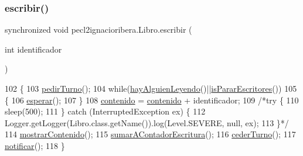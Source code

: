 \subsubsection{\texorpdfstring{escribir()}{escribir()}}
{\footnotesize\ttfamily synchronized void pecl2ignacioribera.\+Libro.\+escribir (\begin{DoxyParamCaption}\item[{int}]{identificador }\end{DoxyParamCaption})\hspace{0.3cm}{\ttfamily [inline]}}


\begin{DoxyCode}
102     \{
103         \mbox{\hyperlink{classpecl2ignacioribera_1_1_libro_aa68bbbcfa16984a13f848e8a2038c97a}{pedirTurno}}();
104         \textcolor{keywordflow}{while}(\mbox{\hyperlink{classpecl2ignacioribera_1_1_libro_a3ec78c4737fd60d84388e87f7f1d606f}{hayAlguienLeyendo}}()||\mbox{\hyperlink{classpecl2ignacioribera_1_1_libro_aabc572905978f8f3e19dd6533084149a}{isPararEscritores}}())
105         \{
106             \mbox{\hyperlink{classpecl2ignacioribera_1_1_libro_a4c83b4f2726cfe98dcac1feb72e39b02}{esperar}}();
107         \}
108         \mbox{\hyperlink{classpecl2ignacioribera_1_1_libro_acb52ac741427b64544c1f65b6bbb898a}{contenido}} = \mbox{\hyperlink{classpecl2ignacioribera_1_1_libro_acb52ac741427b64544c1f65b6bbb898a}{contenido}} + identificador;
109         \textcolor{comment}{/*try \{}
110 \textcolor{comment}{            sleep(500);}
111 \textcolor{comment}{        \} catch (InterruptedException ex) \{}
112 \textcolor{comment}{            Logger.getLogger(Libro.class.getName()).log(Level.SEVERE, null, ex);}
113 \textcolor{comment}{        \}*/}
114         \mbox{\hyperlink{classpecl2ignacioribera_1_1_libro_abe0c6068a2acc893bca1caff4c6bf424}{mostrarContenido}}();
115         \mbox{\hyperlink{classpecl2ignacioribera_1_1_libro_a2e74a67a271d83b8ce93e1807216c997}{sumarAContadorEscritura}}();
116         \mbox{\hyperlink{classpecl2ignacioribera_1_1_libro_a78cc01e6cefa7dc833706d59550a4624}{cederTurno}}();
117         \mbox{\hyperlink{classpecl2ignacioribera_1_1_libro_a44cfbf7f47ada045300c48a3712aa804}{notificar}}();
118     \}
\end{DoxyCode}
\mbox{\label{classpecl2ignacioribera_1_1_libro_a4c83b4f2726cfe98dcac1feb72e39b02}} 
